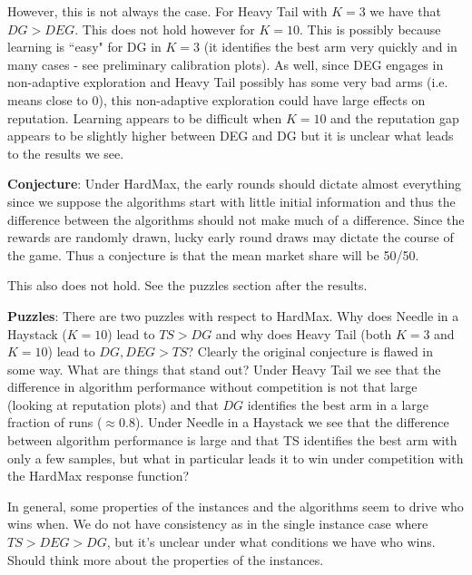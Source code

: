 \documentclass[11pt,letterpaper]{article}
\begin{document}
However, this is not always the case. For Heavy Tail with $K = 3$ we have that $DG > DEG$. This does not hold however for $K = 10$. This is possibly because learning is ``easy" for DG in $K = 3$ (it identifies the best arm very quickly and in many cases - see preliminary calibration plots). As well, since DEG engages in non-adaptive exploration and Heavy Tail possibly has some very bad arms (i.e. means close to 0), this non-adaptive exploration could have large effects on reputation. Learning appears to be difficult when $K = 10$ and the reputation gap appears to be slightly higher between DEG and DG but it is unclear what leads to the results we see.

\textbf{Conjecture}: Under HardMax, the early rounds should dictate almost everything since we suppose the algorithms start with little initial information and thus the difference between the algorithms should not make much of a difference. Since the rewards are randomly drawn, lucky early round draws may dictate the course of the game. Thus a conjecture is that the mean market share will be 50/50.

This also does not hold. See the puzzles section after the results.



\textbf{Puzzles}: There are two puzzles with respect to HardMax. Why does Needle in a Haystack ($K = 10$) lead to $TS > DG$ and why does Heavy Tail (both $K = 3$ and $K = 10$) lead to $DG, DEG > TS$? Clearly the original conjecture is flawed in some way. What are things that stand out? Under Heavy Tail we see that the difference in algorithm performance without competition is not that large (looking at reputation plots) and that $DG$ identifies the best arm in a large fraction of runs ($\approx 0.8$). Under Needle in a Haystack we see that the difference between algorithm performance is large and that TS identifies the best arm with only a few samples, but what in particular leads it to win under competition with the HardMax response function?

In general, some properties of the instances and the algorithms seem to drive who wins when. We do not have consistency as in the single instance case where $TS > DEG > DG$, but it's unclear under what conditions we have who wins. Should think more about the properties of the instances.
\end{document}
